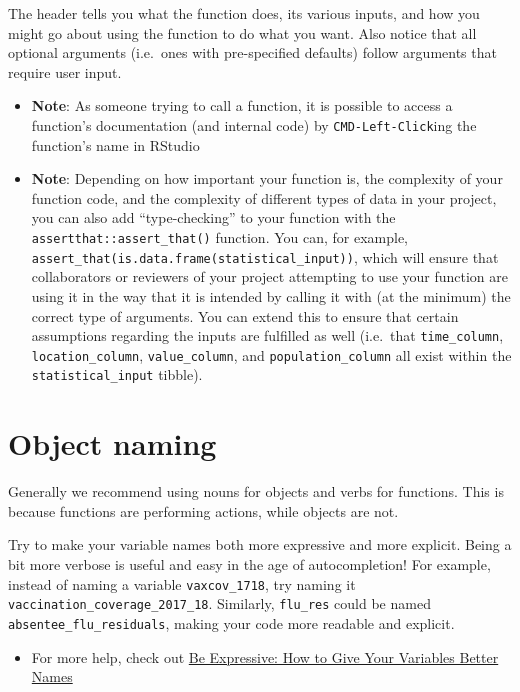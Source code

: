 \documentclass[
]{book}
\providecommand{\tightlist}{%
  \setlength{\itemsep}{0pt}\setlength{\parskip}{0pt}}
\begin{document}
The header tells you what the function does, its various inputs, and how you might go about using the function to do what you want. Also notice that all optional arguments (i.e.~ones with pre-specified defaults) follow arguments that require user input.

\begin{itemize}
\item
  \textbf{Note}: As someone trying to call a function, it is possible to access a function's documentation (and internal code) by \texttt{CMD-Left-Click}ing the function's name in RStudio
\item
  \textbf{Note}: Depending on how important your function is, the complexity of your function code, and the complexity of different types of data in your project, you can also add ``type-checking'' to your function with the \texttt{assertthat::assert\_that()} function. You can, for example, \texttt{assert\_that(is.data.frame(statistical\_input))}, which will ensure that collaborators or reviewers of your project attempting to use your function are using it in the way that it is intended by calling it with (at the minimum) the correct type of arguments. You can extend this to ensure that certain assumptions regarding the inputs are fulfilled as well (i.e.~that \texttt{time\_column}, \texttt{location\_column}, \texttt{value\_column}, and \texttt{population\_column} all exist within the \texttt{statistical\_input} tibble).
\end{itemize}

\hypertarget{object-naming}{%
\section{Object naming}\label{object-naming}}

Generally we recommend using nouns for objects and verbs for functions. This is because functions are performing actions, while objects are not.

Try to make your variable names both more expressive and more explicit. Being a bit more verbose is useful and easy in the age of autocompletion! For example, instead of naming a variable \texttt{vaxcov\_1718}, try naming it \texttt{vaccination\_coverage\_2017\_18}. Similarly, \texttt{flu\_res} could be named \texttt{absentee\_flu\_residuals}, making your code more readable and explicit.

\begin{itemize}
\tightlist
\item
  For more help, check out \href{https://spin.atomicobject.com/2017/11/01/good-variable-names/}{Be Expressive: How to Give Your Variables Better Names}
\end{itemize}
\end{document}
